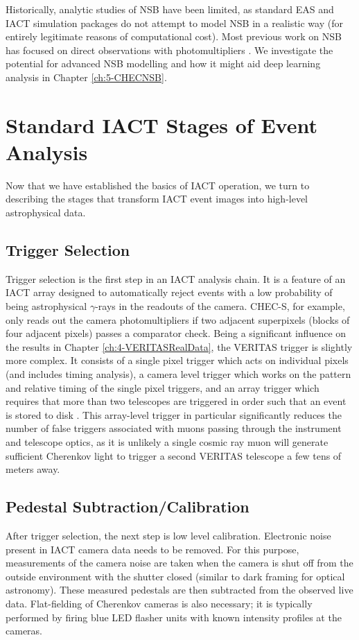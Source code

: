 Historically, analytic studies of NSB have been limited, as standard EAS and IACT simulation packages do not attempt to model NSB in a realistic way (for entirely legitimate reasons of computational cost). Most previous work on NSB has focused on direct observations with photomultipliers \cite{BandE}. We investigate the potential for advanced NSB modelling and how it might aid deep learning analysis in Chapter \ref{ch:5-CHECNSB}.

\section{Standard IACT Stages of Event Analysis}\label{app:imaging}
Now that we have established the basics of IACT operation, we turn to describing the stages that transform IACT event images into high-level astrophysical data.
\subsection{Trigger Selection}

Trigger selection is the first step in an IACT analysis chain. It is a feature of an IACT array designed to automatically reject events with a low probability of being astrophysical $\gamma$-rays in the readouts of the camera. CHEC-S, for example, only reads out the camera photomultipliers if two adjacent superpixels (blocks of four adjacent pixels) passes a comparator check. Being a significant influence on the results in Chapter \ref{ch:4-VERITASRealData}, the VERITAS trigger is slightly more complex. It consists of a single pixel trigger which acts on individual pixels (and includes timing analysis), a camera level trigger which works on the pattern and relative timing of the single pixel triggers, and an array trigger which requires that more than two telescopes are triggered in order such that an event is stored to disk \cite{veritastrigger}. This array-level trigger in particular significantly reduces the number of false triggers associated with muons passing through the instrument and telescope optics, as it is unlikely a single cosmic ray muon will generate sufficient Cherenkov light to trigger a second VERITAS telescope a few tens of meters away. 

\subsection{Pedestal Subtraction/Calibration}

After trigger selection, the next step is low level calibration. Electronic noise present in IACT camera data needs to be removed. For this purpose, measurements of the camera noise are taken when the camera is shut off from the outside environment with the shutter closed (similar to dark framing for optical astronomy). These measured pedestals are then subtracted from the observed live data. Flat-fielding of Cherenkov cameras is also necessary; it is typically performed by firing blue LED flasher units with known intensity profiles at the cameras.

